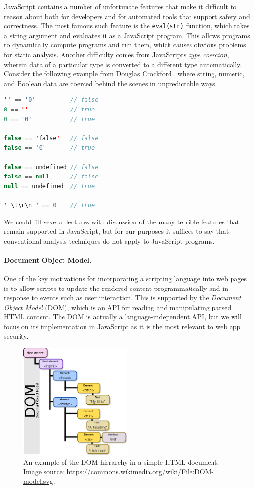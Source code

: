 \documentclass[11pt,twoside]{scrartcl}
\begin{document}
JavaScript contains a number of unfortunate features that make it difficult to reason about both for developers and for automated tools that support safety and correctness. The most famous such feature is the \verb'eval(str)' function, which takes a string argument and evaluates it as a JavaScript program. This allows programs to dynamically compute programs and run them, which causes obvious problems for static analysis. Another difficulty comes from JavaScripts \emph{type coercion}, wherein data of a particular type is converted to a different type automatically. Consider the following example from Douglas Crockford~\cite{Crockford2008} where string, numeric, and Boolean data are coerced behind the scenes in unpredictable ways.
\begin{lstlisting}[language=Java]
'' == '0'          // false
0 == ''            // true
0 == '0'           // true

false == 'false'   // false
false == '0'       // true

false == undefined // false
false == null      // false
null == undefined  // true

' \t\r\n ' == 0    // true
\end{lstlisting}

We could fill several lectures with discussion of the many terrible features that remain supported in JavaScript, but for our purposes it suffices to say that conventional analysis techniques do not apply to JavaScript programs.

\paragraph{Document Object Model.}
One of the key motivations for incorporating a scripting language into web pages is to allow scripts to update the rendered content programmatically and in response to events such as user interaction. This is supported by the \emph{Document Object Model} (DOM), which is an API for reading and manipulating parsed HTML content. The DOM is actually a language-independent API, but we will focus on its implementation in JavaScript as it is the most relevant to web app security.

\begin{figure}
\centering
\includegraphics[width=0.5\textwidth]{dom.png}

\caption{\label{fig:dom} An example of the DOM hierarchy in a simple HTML document. Image source: \url{https://commons.wikimedia.org/wiki/File:DOM-model.svg}.}
\end{figure}
\end{document}
